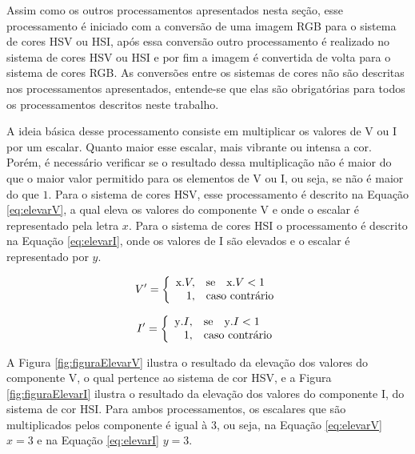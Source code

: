 \documentclass[	12pt, Times, openright, twoside, a4paper, english, brazil]{abntex2}
\begin{document}
Assim como os outros processamentos apresentados nesta seção, esse processamento é iniciado com a conversão de uma imagem RGB para o sistema de cores HSV ou HSI, após essa conversão outro processamento é realizado no sistema de cores HSV ou HSI e por fim a imagem é convertida de volta para o sistema de cores RGB. As conversões entre os sistemas de cores não são descritas nos processamentos apresentados, entende-se que elas são obrigatórias para todos os processamentos descritos neste trabalho.

A ideia básica desse processamento consiste em multiplicar os valores de V ou I por um escalar. Quanto maior esse escalar, mais vibrante ou intensa a cor. Porém, é necessário verificar se o resultado dessa multiplicação não é maior do que o maior valor permitido para os elementos de V ou I, ou seja, se não é maior do que $1$. Para o sistema de cores HSV, esse processamento é descrito na Equação \ref{eq:elevarV}, a qual eleva os valores do componente V e onde o escalar é representado pela letra $x$. Para o sistema de cores HSI o processamento é descrito na Equação \ref{eq:elevarI}, onde os valores de I são elevados e o escalar é representado por $y$.

\begin{equation}
\label{eq:elevarV}
V'=\left\{
\begin{array}{rl}
       $x$ . V,&\mbox{se}\quad $x$ . V < 1 \\
       1,&\mbox{caso contrário}
\end{array}\right.
\end{equation}

\begin{equation}
\label{eq:elevarI}
I'=\left\{
\begin{array}{rl}
       $y$ . I,&\mbox{se}\quad $y$ . I < 1 \\
       1,&\mbox{caso contrário}
\end{array}\right.
\end{equation}

A Figura \ref{fig:figuraElevarV} ilustra o resultado da elevação dos valores do componente V, o qual pertence ao sistema de cor HSV, e a Figura \ref{fig:figuraElevarI} ilustra o resultado da elevação dos valores do componente I, do sistema de cor HSI. Para ambos processamentos, os escalares que são multiplicados pelos componente é igual à $3$, ou seja, na Equação \ref{eq:elevarV} $x=3$ e na Equação \ref{eq:elevarI} $y=3$.
\end{document}
